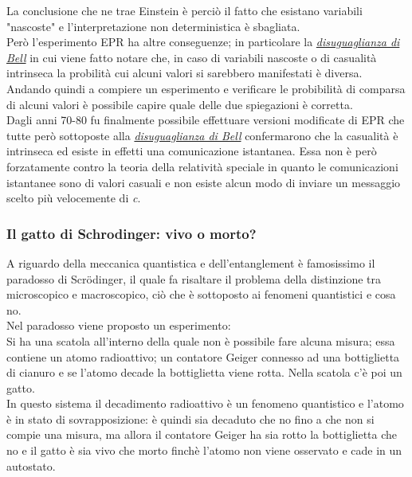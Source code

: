 La conclusione che ne trae Einstein è perciò il fatto che esistano variabili "nascoste" e l'interpretazione non deterministica è sbagliata.\\
Però l'esperimento EPR ha altre conseguenze; in particolare la \textit{\underline{disuguaglianza di Bell}} in cui viene fatto notare che, in caso di variabili nascoste o di casualità intrinseca la probilità cui alcuni valori si sarebbero manifestati è diversa. Andando quindi a compiere un esperimento e verificare le probibilità di comparsa di alcuni valori è possibile capire quale delle due spiegazioni è corretta.\\
Dagli anni 70-80 fu finalmente possibile effettuare versioni modificate di EPR che tutte però sottoposte alla \textit{\underline{disuguaglianza di Bell}} confermarono che la casualità è intrinseca ed esiste in effetti una comunicazione istantanea. Essa non è però forzatamente contro la teoria della relatività speciale in quanto le comunicazioni istantanee sono di valori casuali e non esiste alcun modo di inviare un messaggio scelto più velocemente di \textit{c}.
\subsubsection{Il gatto di Schrodinger: vivo o morto?}
A riguardo della meccanica quantistica e dell'entanglement è famosissimo il paradosso di Scr\"{o}dinger, il quale fa risaltare il problema della distinzione tra microscopico e macroscopico, ciò che è sottoposto ai fenomeni quantistici e cosa no.\\
Nel paradosso viene proposto un esperimento:\\
Si ha una scatola all'interno della quale non è possibile fare alcuna misura; essa contiene un atomo radioattivo; un contatore Geiger connesso ad una bottiglietta di cianuro e se l'atomo decade la bottiglietta viene rotta. Nella scatola c'è poi un gatto.\\
In questo sistema il decadimento radioattivo è un fenomeno quantistico e l'atomo è in stato di sovrapposizione: è quindi sia decaduto che no fino a che non si compie una misura, ma allora il contatore Geiger ha sia rotto la bottiglietta che no e il gatto è sia vivo che morto finchè l'atomo non viene osservato e cade in un autostato.